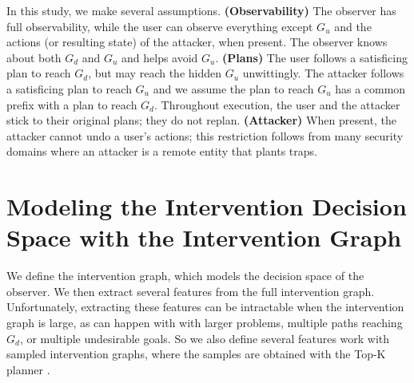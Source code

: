 \documentclass[letterpaper]{article}
\newcommand{\frommak}[1]{\frombody{ForestGreen}{Mak}{#1}}
\newcommand{\frombody}[3]{\noindent\textcolor{#1}{{$\bf [\![\!\![$}\underline{\scshape{#2}} {\scshape says:} \textsl{#3}{$\bf ]\!\!]\!]$}}}
\theoremstyle{plain}
\begin{document}
In this study, we make several assumptions.
\textbf{(Observability)} 
The observer has full observability, while the user can observe everything except $G_u$ and the actions (or resulting state) of the attacker, when present.
The observer knows about both $G_d$ and $G_u$ and helps avoid $G_u$.
\textbf{(Plans)} 
The user follows a satisficing plan to reach $G_d$, but may reach the hidden $G_u$ unwittingly. 
The attacker follows a satisficing plan to reach $G_u$ and we assume the plan to reach $G_u$ has a common prefix with a plan to reach $G_d$. 
Throughout execution, the user and the attacker stick to their original plans; they do not replan.
\textbf{(Attacker)}
When present, the attacker cannot undo a user's actions; this restriction follows from many security domains where an attacker is a remote entity that plants traps.




\section{Modeling the Intervention Decision Space with the Intervention Graph}
\label{sec:stategraph}
We define the intervention graph, which models the decision space of the observer.
We then extract several features from the full intervention graph.
Unfortunately, extracting these features can be intractable when the intervention graph is large, as can happen with with larger problems, multiple paths reaching $G_d$, or multiple undesirable goals. So we also define several features work with sampled intervention graphs, where the samples are obtained with the Top-K planner \cite{riabov2014}.
\end{document}
